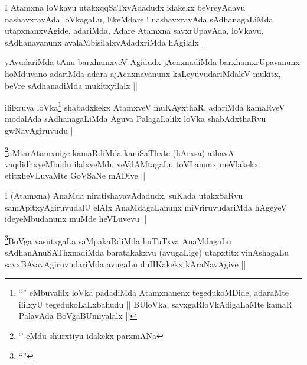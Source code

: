 
\begin{artha}
I Atamxna loVkavu utakxqqSaTxvAdadudx idakekx beVreyAdavu
nashavxravAda loVkagaLu, EkeMdare ! nashavxravAda sAdhanagaLiMda
utapxnanxvAgide, adariMda, Adare Atamxna savxrUpavAda, loVkavu,
sAdhanavanunx avalaMbisilalxvAdadxriMda hAgilalx ||
\end{artha}

\begin{artha}
yAvudariMda tAnu barxhamxveV Agidudx jAcnxnadiMda barxhamxrUpavanunx
hoMduvano adariMda adara ajAcnxnavanunx kaLeyuvudariMdaleV mukitx,
beVre sAdhanadiMda mukitxyilalx ||
\end{artha}


\begin{artha}
ililxruva loVka\footnote[1]{``\stext'' eMbuvalilx loVka padadiMda
  Atamxnanenx tegedukoMDide, adaraMte ililxyU tegedukoLaLxbahudu ||
  BUloVka, savxgaRloVkAdigaLaMte kamaR PalavAda BoVgaBUmiyalalx ||} shabadxkekx AtamxveV muKAyxthaR,
adariMda kamaRveV modalAda sAdhanagaLiMda Aguva PalagaLalilx loVka
shabAdxthaRvu gwNavAgiruvudu ||
\end{artha}


\begin{artha}
\footnote[2]{`\stext' eMdu shurxtiyu idakekx parxmANa}aMtarAtamxnige kamaRdiMda kaniSaThxte (hArxsa) athavA vaqdidhxyeMbudu
ilalxveMdu veVdAMtagaLu toVLanunx meVlakekx etitxheVLuvaMte GoVSaNe
mADive ||
\end{artha}


\begin{artha}
I (Atamxna) AnaMda niratishayavAdadudx, suKada utakxSaRvu
samApitxyAgiruvudalU elAlx AnaMdagaLanunx miVriruvudariMda hAgeyeV
ideyeMbudanunx muMde heVLuvevu ||
\end{artha}

\begin{artha}
\footnote[1]{``\stext''}BoVga vasutxgaLa saMpakaRdiMda huTuTxva AnaMdagaLu
sAdhanAnuSAThxnadiMda baratakakxvu (avugaLige) utapxtitx vinAshagaLu
savxBAvavAgiruvudariMda avugaLu duHKakekx kAraNavAgive ||
\end{artha}

